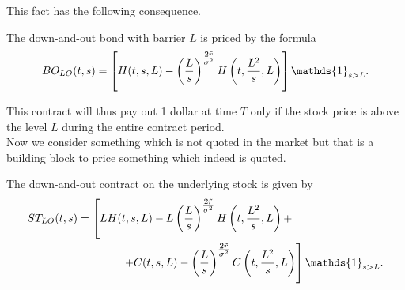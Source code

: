This fact has the following consequence. 
\begin{proposition}
    The down-and-out bond with barrier $L$ is priced by the formula
    \begin{equation}
        BO_{LO}(t,s) = \left[H(t,s,L) - \left(\frac{L}{s}\right)^{\tfrac{2\Tilde{r}}{\sigma^2}}H\left(t,\frac{L^2}{s},L\right)\right]\mathds{1}_{s>L}.
    \end{equation}
\end{proposition}
This contract will thus pay out 1 dollar at time $T$ only if the stock price is above the level $L$ during the entire contract period. \\
Now we consider something which is not quoted in the market but that is a building block to price something which indeed is quoted.
\begin{proposition}
    The down-and-out contract on the underlying stock is given by
    \begin{align}
        \notag ST_{LO}(t,s) &= \left[LH(t,s,L) - L\left(\frac{L}{s}\right)^{\tfrac{2\Tilde{r}}{\sigma^2}}H\left(t,\frac{L^2}{s},L\right) + \right. \\
        &\qquad\qquad
        \left. + C(t,s,L) - \left(\frac{L}{s}\right)^{\tfrac{2\Tilde{r}}{\sigma^2}}C\left(t,\frac{L^2}{s},L\right)\right]\mathds{1}_{s>L}.
    \end{align}
\end{proposition}
